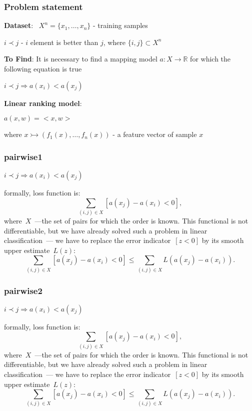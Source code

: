 \documentclass{beamer}
\begin{document}
\begin{frame}
\frametitle{Problem statement}


\textbf{Dataset}: ~$X^n = \{x_1, \dots, x_n\}$ - training samples

$ i \prec j$ - $i$ element is better than $j$, where $\{i,j\} \subset X^n$



\textbf{To Find}: It is necessary to find a mapping model $a : X \rightarrow \mathbb{R}$ for which the following equation is true
\begin{center}
    $ i \prec j \Rightarrow a(x_i) < a(x_j) $
\end{center}

\textbf{Linear ranking model}:
\begin{center}
$ a(x, w) = <x,w>$
\end{center}

where $x \rightarrowtail (f_1(x), \dots, f_n(x))$ - a feature vector of sample $x$
\end{frame}

\begin{frame}
\frametitle{pairwise1}

\begin{center}
    $ i \prec j \Rightarrow a(x_i) < a(x_j) $
\end{center}

formally, loss function is:
\[
    \sum_{(i, j) \in X}
        [a(x_j) - a(x_i) < 0],
\]
where~$X$~---the set of pairs for which the order is known.
This functional is not differentiable, but we have already solved such a problem in linear classification~---
we have to replace the error indicator~$[z < 0]$ by its smooth upper estimate~$L(z)$:
\[
    \sum_{(i, j) \in X}
        [a(x_j) - a(x_i) < 0]
    \leq
    \sum_{(i, j) \in X}
        L\left(
            a(x_j) - a(x_i)
        \right).
\]
\end{frame}

\begin{frame}
\frametitle{pairwise2}

\begin{center}
    $ i \prec j \Rightarrow a(x_i) < a(x_j) $
\end{center}

formally, loss function is:
\[
    \sum_{(i, j) \in X}
        [a(x_j) - a(x_i) < 0],
\]
where~$X$~---the set of pairs for which the order is known.
This functional is not differentiable, but we have already solved such a problem in linear classification~---
we have to replace the error indicator~$[z < 0]$ by its smooth upper estimate~$L(z)$:
\[
    \sum_{(i, j) \in X}
        [a(x_j) - a(x_i) < 0]
    \leq
    \sum_{(i, j) \in X}
        L\left(
            a(x_j) - a(x_i)
        \right).
\]
\end{frame}
\end{document}
